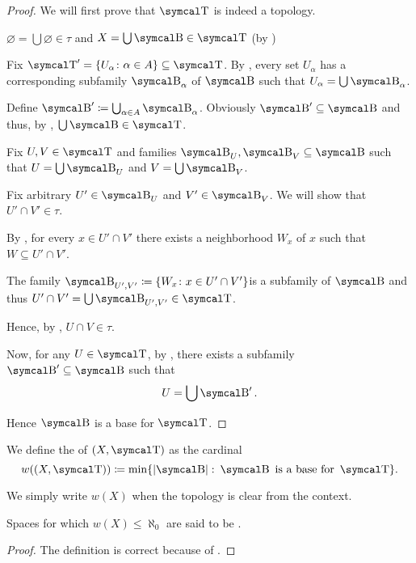 \begin{proof}
  We will first prove that \( \CT \) is indeed a topology.

  \begin{description}
     \( \varnothing = \bigcup \varnothing \in \tau \) and \( X = \bigcup \CB \in \CT \) (by )

     Fix \( \CT' = \{ U_\alpha \colon \alpha \in A \} \subseteq \CT \). By , every set \( U_\alpha \) has a corresponding subfamily \( \CB_\alpha \) of \( \CB \) such that \( U_\alpha = \bigcup \CB_\alpha \).

    Define \( \CB' \coloneqq \bigcup_{\alpha \in A} \CB_\alpha \). Obviously \( \CB' \subseteq \CB \) and thus, by , \( \bigcup \CB \in \CT \).

     Fix \( U, V \in \CT \) and families \( \CB_U, \CB_V \subseteq \CB \) such that \( U = \bigcup \CB_U \) and \( V = \bigcup \CB_V \).

    Fix arbitrary \( U' \in \CB_U \) and \( V' \in \CB_V \). We will show that \( U' \cap V' \in \tau \).

    By , for every \( x \in U' \cap V' \) there exists a neighborhood \( W_x \) of \( x \) such that \( W \subseteq U' \cap V' \).

    The family \( \CB_{U',V'} \coloneqq \{ W_x \colon x \in U' \cap V' \} \)\AOC is a subfamily of \( \CB \) and thus \( U' \cap V' = \bigcup \CB_{U',V'} \in \CT \).

    Hence, by , \( U \cap V \in \tau \).
  \end{description}

  Now, for any \( U \in \CT \), by , there exists a subfamily \( \CB' \subseteq \CB \) such that
  \begin{equation*}
    U = \bigcup \CB'.
  \end{equation*}

  Hence \( \CB \) is a base for \( \CT \).
\end{proof}

\begin{definition}\label{def:topological_space_weight}
  We define the  of \( (X, \CT) \) as the cardinal
  \begin{equation*}
    w((X, \CT)) \coloneqq \min \{ \Abs{\CB} \colon \CB \text{ is a base for } \CT \}.
  \end{equation*}

  We simply write \( w(X) \) when the topology is clear from the context.

  Spaces for which \( w(X) \leq \aleph_0 \) are said to be .
\end{definition}
\begin{proof}
  The definition is correct because of .
\end{proof}

